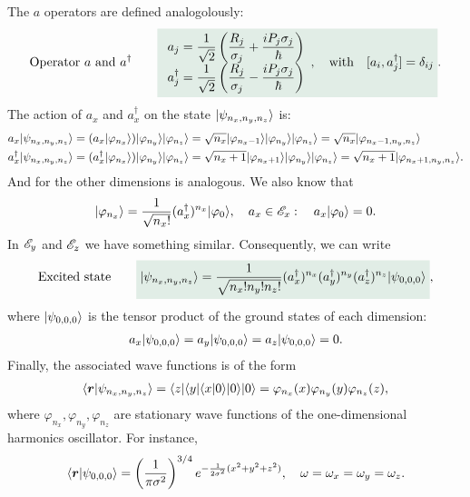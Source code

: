 The $a$ operators are defined analogolously:
\begin{align}
    \text{Operator $a$ and $a^\dagger$}\qquad\highlight{
        \begin{array}{l}a_j=\dfrac{1}{\sqrt{2}}\left(\dfrac{R_j}{\sigma_j}+\dfrac{iP_j\sigma_j}{\hbar}\right)\\
            a^\dagger_j=\dfrac{1}{\sqrt{2}}\left(\dfrac{R_j}{\sigma_j}-\dfrac{iP_j\sigma_j}{\hbar}\right)
        \end{array},\quad\text{with}\quad[a_i,a^\dagger_j]=\delta_{ij}}.
\end{align}
The action of $a_x$ and $a_x^\dagger$ on the state $|\psi_{n_x,n_y,n_z}\rangle$ is:
\begin{align}
    a_x|\psi_{n_x,n_y,n_z}\rangle&=(a_x|\varphi_{n_x}\rangle)|\varphi_{n_y}\rangle|\varphi_{n_z}\rangle=\sqrt{n_x}|\varphi_{n_x-1}\rangle|\varphi_{n_y}\rangle|\varphi_{n_z}\rangle=\sqrt{n_x}|\varphi_{n_x-1,n_y,n_z}\rangle\\
    a_x^\dagger|\psi_{n_x,n_y,n_z}\rangle&=(a_x^\dagger|\varphi_{n_x}\rangle)|\varphi_{n_y}\rangle|\varphi_{n_z}\rangle=\sqrt{n_x+1}|\varphi_{n_x+1}\rangle|\varphi_{n_y}\rangle|\varphi_{n_z}\rangle=\sqrt{n_x+1}|\varphi_{n_x+1,n_y,n_z}\rangle.
\end{align}
And for the other dimensions is analogous. We also know that 
\begin{align*}
    |\varphi_{n_x}\rangle=\frac{1}{\sqrt{n_x!}}(a_x^\dagger)^{n_x}|\varphi_0\rangle,\quad a_x\in\mathscr{E}_x:\quad a_x|\varphi_0\rangle=0.
\end{align*}
In $\mathscr{E}_y$ and $\mathscr{E}_z$ we have something similar. Consequently, we can write 
\begin{align}
    \text{Excited state}\qquad\highlight{\ket{\psi_{n_x,n_y,n_z}}=\frac{1}{\sqrt{n_x!n_y!n_z!}}(a_x^\dagger)^{n_x}(a_y^\dagger)^{n_y}(a_z^\dagger)^{n_z}\ket{\psi_{0,0,0}}},
\end{align}
where $|\psi_{0,0,0}\rangle$ is the tensor product of the ground states of each dimension:
\begin{align*}
    a_x|\psi_{0,0,0}\rangle=a_y|\psi_{0,0,0}\rangle=a_z|\psi_{0,0,0}\rangle=0.
\end{align*}
Finally, the associated wave functions is of the form 
\begin{align}
    \langle\bm{r}|\psi_{n_x,n_y,n_z}\rangle=\langle z|\langle y|\langle x|0\rangle|0\rangle|0\rangle=\varphi_{n_x}(x)\varphi_{n_y}(y)\varphi_{n_z}(z),
\end{align}
where $\varphi_{n_x},\varphi_{n_y},\varphi_{n_z}$ are stationary wave functions of the one-dimensional harmonics oscillator.
For instance,
\begin{align}
    \langle\bm{r}|\psi_{0,0,0}\rangle=\left(\frac{1}{\pi\sigma^2}\right)^{3/4}e^{-\frac{1}{2\sigma^2}(x^2+y^2+z^2)},\quad\omega=\omega_x=\omega_y=\omega_z.
\end{align}
%
